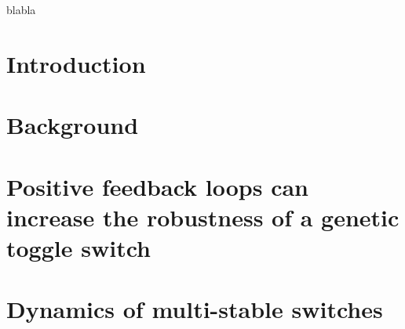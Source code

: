 \documentclass[]{phdthesis}
\begin{document}
\tableofcontents*
\listoffigures
\listoftables
{}

\printglossary[type=\acronymtype, title=Abbreviations, toctitle=List of Abbreviations]


\begin{acknowledgements}
blabla
\end{acknowledgements}


\mainmatter*
\chapter{Introduction}
\label{ch:Intro}


\mainmatter*
\chapter{Background}
\label{ch:backg}



%

\mainmatter*
\chapter{Positive feedback loops can increase the robustness of a genetic toggle switch}
\label{ch:abcsysbio}



\mainmatter*
 
\chapter{Dynamics of multi-stable switches}
\label{ch:SF}

%
%
%
%
%
\end{document}
